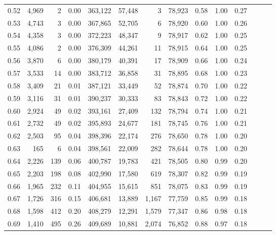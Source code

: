 \begin{tabular}{rrrrrrrrrrrrrr}
0.52 &   4,969 &      2 &  0.00 &  363,122 &   57,448 &       3 &  78,923 &  0.58 &  1.00 &      0.27 \\
0.53 &   4,743 &      3 &  0.00 &  367,865 &   52,705 &       6 &  78,920 &  0.60 &  1.00 &      0.26 \\
0.54 &   4,358 &      3 &  0.00 &  372,223 &   48,347 &       9 &  78,917 &  0.62 &  1.00 &      0.25 \\
0.55 &   4,086 &      2 &  0.00 &  376,309 &   44,261 &      11 &  78,915 &  0.64 &  1.00 &      0.25 \\
0.56 &   3,870 &      6 &  0.00 &  380,179 &   40,391 &      17 &  78,909 &  0.66 &  1.00 &      0.24 \\
0.57 &   3,533 &     14 &  0.00 &  383,712 &   36,858 &      31 &  78,895 &  0.68 &  1.00 &      0.23 \\
0.58 &   3,409 &     21 &  0.01 &  387,121 &   33,449 &      52 &  78,874 &  0.70 &  1.00 &      0.22 \\
0.59 &   3,116 &     31 &  0.01 &  390,237 &   30,333 &      83 &  78,843 &  0.72 &  1.00 &      0.22 \\
0.60 &   2,924 &     49 &  0.02 &  393,161 &   27,409 &     132 &  78,794 &  0.74 &  1.00 &      0.21 \\
0.61 &   2,732 &     49 &  0.02 &  395,893 &   24,677 &     181 &  78,745 &  0.76 &  1.00 &      0.21 \\
0.62 &   2,503 &     95 &  0.04 &  398,396 &   22,174 &     276 &  78,650 &  0.78 &  1.00 &      0.20 \\
0.63 &     165 &      6 &  0.04 &  398,561 &   22,009 &     282 &  78,644 &  0.78 &  1.00 &      0.20 \\
0.64 &   2,226 &    139 &  0.06 &  400,787 &   19,783 &     421 &  78,505 &  0.80 &  0.99 &      0.20 \\
0.65 &   2,203 &    198 &  0.08 &  402,990 &   17,580 &     619 &  78,307 &  0.82 &  0.99 &      0.19 \\
0.66 &   1,965 &    232 &  0.11 &  404,955 &   15,615 &     851 &  78,075 &  0.83 &  0.99 &      0.19 \\
0.67 &   1,726 &    316 &  0.15 &  406,681 &   13,889 &   1,167 &  77,759 &  0.85 &  0.99 &      0.18 \\
0.68 &   1,598 &    412 &  0.20 &  408,279 &   12,291 &   1,579 &  77,347 &  0.86 &  0.98 &      0.18 \\
0.69 &   1,410 &    495 &  0.26 &  409,689 &   10,881 &   2,074 &  76,852 &  0.88 &  0.97 &      0.18 \\

\end{tabular}
